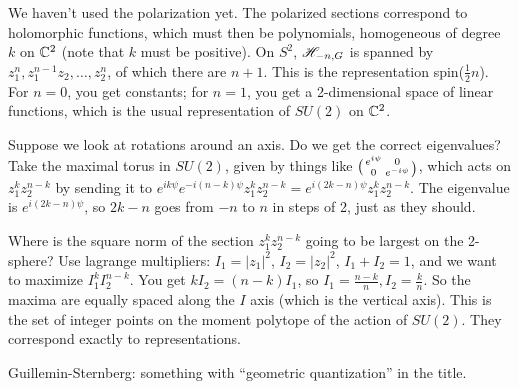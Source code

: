  We haven't used the polarization yet.  The polarized sections correspond to
 holomorphic functions, which must then be polynomials, homogeneous of degree $k$ on
 $\mathbb{C}^2$ (note that $k$ must be positive).  On $S^2$, $\mathscr{H}_{-n,G}$ is spanned by
 $z_1^n,z_1^{n-1}z_2,\dots, z_2^n$, of which there are $n+1$.  This is the
 representation spin($\frac{1}{2}n$).  For $n=0$, you get constants; for $n=1$, you
 get a 2-dimensional space of linear functions, which is the usual representation of
 $SU(2)$ on $\mathbb{C}^2$.

 Suppose we look at rotations around an axis.  Do we get the correct eigenvalues?
 Take the maximal torus in $SU(2)$, given by things like
 $\matrix{e^{i\psi}}{0}{0}{e^{-i\psi}}$, which acts on $z_1^kz_2^{n-k}$ by sending it
 to $e^{ik\psi}e^{-i(n-k)\psi}z_1^kz_2^{n-k}=e^{i(2k-n)\psi}z_1^kz_2^{n-k}$.  The
 eigenvalue is $e^{i(2k-n)\psi}$, so $2k-n$ goes from $-n$ to $n$ in steps of 2, just
 as they should.

 Where is the square norm of the section $z_1^kz_2^{n-k}$ going to be largest on the
 2-sphere?  Use lagrange multipliers: $I_1=|z_1|^2$, $I_2=|z_2|^2$, $I_1+I_2=1$, and
 we want to maximize $I_1^kI_2^{n-k}$.  You get $kI_2=(n-k)I_1$, so
 $I_1=\frac{n-k}{n}, I_2=\frac{k}{n}$.  So the maxima are equally spaced along the $I$
 axis (which is the vertical axis).  This is the set of integer points on the moment
 polytope of the action of $SU(2)$. They correspond exactly to representations.

 Guillemin-Sternberg: something with ``geometric quantization'' in the title.
